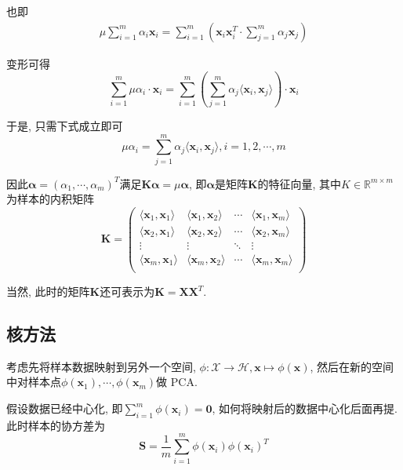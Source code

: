 \documentclass[a4paper,UTF8]{ctexart}
\theoremstyle{plain} \newtheorem{theorem}{定理}[section]
\theoremstyle{plain} \newtheorem{definition}{定义}[section]
\theoremstyle{plain} \newtheorem{lemma}{引理}[section]
\theoremstyle{plain} \newtheorem{proposition}{命题}[section]
\theoremstyle{plain} \newtheorem{example}{例}[section]
\theoremstyle{plain} \newtheorem{remark}{注}[section]
\theoremstyle{plain} \newtheorem{corollary}{推论}[section]
\begin{document}
也即
\begin{align*}
\mu \sum_{i = 1}^{m} \alpha_i \bm{x}_i = \sum_{i = 1}^{m} \left( \bm{x}_i \bm{x}_{i}^{T} \cdot \sum_{j = 1}^{m} \alpha_j \bm{x}_j \right)
\end{align*}

变形可得
\begin{equation*}
 \sum_{i = 1}^{m} \mu \alpha_i \cdot \bm{x}_i = \sum_{i = 1}^{m} \left( \sum_{j = 1}^{m} \alpha_j \langle \bm{x}_i, \bm{x}_j \rangle \right) \cdot \bm{x}_i
\end{equation*}

于是, 只需下式成立即可
\begin{equation*}
\mu \alpha_i =  \sum_{j = 1}^{m} \alpha_j \langle \bm{x}_i, \bm{x}_j \rangle, i = 1, 2, \cdots, m
\end{equation*}

因此$\bm{\alpha} = (\alpha_1, \cdots, \alpha_m)^{T}$满足$\bm{K} \bm{\alpha} = \mu \bm{\alpha}$, 即$\bm{\alpha}$是矩阵$\bm{K}$的特征向量, 其中$K \in \mathbb{R}^{m \times m}$为样本的内积矩阵
\[
\bm{K} = 
\begin{pmatrix}
\langle \bm{x}_1, \bm{x}_1 \rangle & \langle \bm{x}_1, \bm{x}_2 \rangle & \cdots & \langle \bm{x}_1, \bm{x}_m \rangle \\ 
\langle \bm{x}_2, \bm{x}_1 \rangle & \langle \bm{x}_2, \bm{x}_2 \rangle & \cdots & \langle \bm{x}_2, \bm{x}_m \rangle \\ 
\vdots & \vdots & \ddots & \vdots \\ 
\langle \bm{x}_m, \bm{x}_1 \rangle & \langle \bm{x}_m, \bm{x}_2 \rangle & \cdots & \langle \bm{x}_m, \bm{x}_m \rangle \\ 
\end{pmatrix}
\]

当然, 此时的矩阵$\bm{K}$还可表示为$\bm{K} = \bm{X} \bm{X}^{T}$.

\subsection{核方法}
考虑先将样本数据映射到另外一个空间, $\phi : \mathcal{X} \rightarrow \mathcal{H}, \bm{x} \mapsto \phi(\bm{x})$, 然后在新的空间中对样本点$ \phi(\bm{x}_1), \cdots, \phi(\bm{x}_m)$做 PCA.

假设数据已经中心化, 即$\sum_{i = 1}^{m} \phi(\bm{x}_i) = \bm{0}$, 如何将映射后的数据中心化后面再提. 此时样本的协方差为
\begin{equation*}
\bm{S} = \frac{1}{m} \sum_{i = 1}^{m} \phi(\bm{x}_i) \phi(\bm{x}_i)^{T}
\end{equation*}
\end{document}
